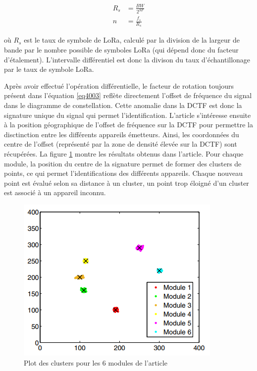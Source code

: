 \begin{align}\label{eq4006}
	R_s &= \frac{BW}{2^{SF}} \\
	n	&= \frac{f_s}{R_s}
\end{align}

où $R_s$ est le taux de symbole de LoRa, calculé par la division de la largeur de bande par le nombre possible de symboles LoRa (qui dépend donc du facteur d'étalement). L'intervalle différentiel est donc la divison du taux d'échantillonage par le taux de symbole LoRa.

\vspace{0.1cm}

Après avoir effectué l'opération différentielle, le facteur de rotation toujours présent dans l'équation \ref{eq4003} reflète directement l'offset de fréquence du signal dans le diagramme de constellation. Cette anomalie dans la DCTF est donc la signature unique du signal qui permet l'identification. L'article s'intéresse ensuite à la position géographique de l'offset de fréquence sur la DCTF pour permettre la disctinction entre les différents appareils émetteurs. Ainsi, les coordonnées du centre de l'offset (représenté par la zone de densité élevée sur la DCTF) sont récupérées. La figure \ref{term4000} montre les résultats obtenus dans l'article. Pour chaque module, la position du centre de la signature permet de former des clusters de points, ce qui permet l'identifications des différents appareils. Chaque nouveau point est évalué selon sa distance à un cluster, un point trop éloigné d'un cluster est associé à un appareil inconnu.


\begin{figure}[h]
\centering

\includegraphics[scale=0.8]{images/impossible.png}
\caption{Plot des clusters pour les 6 modules de l'article\cite{loraDCTF}}\label{term4000}
\end{figure}

